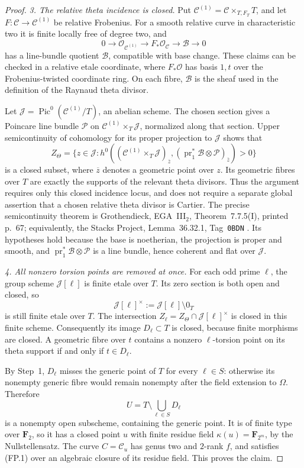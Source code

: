 \begin{proof}
\emph{3. The relative theta incidence is closed.}
Put $\mathcal C^{(1)}=\mathcal C\times_{T,F_T}T$, and let
$F:\mathcal C\to\mathcal C^{(1)}$ be relative Frobenius.
For a smooth relative curve in characteristic two it is finite locally
free of degree two, and
\[
 0\longrightarrow\mathcal O_{\mathcal C^{(1)}}
 \longrightarrow F_*\mathcal O_{\mathcal C}
 \longrightarrow\mathcal B\longrightarrow0
 \tag{FP.2}
\]
has a line-bundle quotient $\mathcal B$, compatible with base change.
These claims can be checked in a relative etale coordinate, where
$F_*\mathcal O$ has basis $1,t$ over the Frobenius-twisted coordinate
ring.  On each fibre, $\mathcal B$ is the sheaf used in the definition
of the Raynaud theta divisor.

Let $\mathcal J=\operatorname{Pic}^0(\mathcal C^{(1)}/T)$, an abelian
scheme.  The chosen section gives a Poincare line bundle $\mathcal P$
on $\mathcal C^{(1)}\times_T\mathcal J$, normalized along that section.
Upper semicontinuity of cohomology for its proper projection to
$\mathcal J$ shows that
\[
 Z_\Theta=
 \{z\in\mathcal J:
 h^0((\mathcal C^{(1)}\times_T\mathcal J)_{\overline z},
       (\operatorname{pr}_1^*\mathcal B\otimes\mathcal P)_{\overline z})>0\}
 \tag{FP.3}
\]
is a closed subset, where $\overline z$ denotes a geometric point
over $z$.  Its geometric fibres over $T$ are
exactly the supports of the relevant theta divisors.  Thus the
argument requires only this closed incidence locus, and does not
require a separate global assertion that a chosen relative theta
divisor is Cartier.  The precise semicontinuity theorem is
Grothendieck, EGA~III$_2$, Theorem~7.7.5(I), printed p.~67;
equivalently, the Stacks Project, Lemma~36.32.1, Tag~\texttt{0BDN} \cite{EGAIII2,Stacks}.
Its hypotheses hold because the base is noetherian, the projection
is proper and smooth, and
$\operatorname{pr}_1^*\mathcal B\otimes\mathcal P$ is a line bundle,
hence coherent and flat over $\mathcal J$.

\emph{4. All nonzero torsion points are removed at once.}
For each odd prime $\ell$, the group scheme $\mathcal J[\ell]$ is
finite etale over $T$.  Its zero section is both open and closed, so
\[
 \mathcal J[\ell]^\times:=\mathcal J[\ell]\setminus0_T
\]
is still finite etale over $T$.  The intersection
$Z_\ell=Z_\Theta\cap\mathcal J[\ell]^\times$ is closed in this finite
scheme.  Consequently its image $D_\ell\subset T$ is closed, because
finite morphisms are closed.  A geometric fibre over $t$ contains a
nonzero $\ell$-torsion point on its theta support if and only if
$t\in D_\ell$.

By Step~1, $D_\ell$ misses the generic point of $T$ for every
$\ell\in S$: otherwise its nonempty generic fibre would remain
nonempty after the field extension to $\Omega$.  Therefore
\[
 U=T\setminus\bigcup_{\ell\in S}D_\ell
\]
is a nonempty open subscheme, containing the generic point.
It is of finite type over $\mathbf F_2$, so it has a closed point $u$
with finite residue field $\kappa(u)=\mathbf F_{2^m}$, by the
Nullstellensatz.  The curve $C=\mathcal C_u$ has genus two and
$2$-rank $f$, and satisfies (FP.1) over an algebraic closure of its
residue field.  This proves the claim.
\end{proof}

